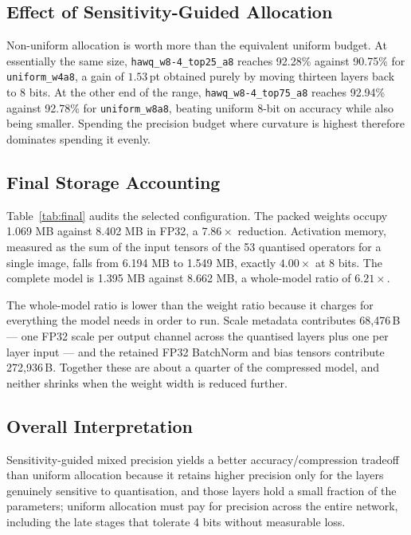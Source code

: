 \documentclass[10pt,a4paper]{article}
\begin{document}
\subsection{Effect of Sensitivity-Guided Allocation}
Non-uniform allocation is worth more than the equivalent uniform budget. At
essentially the same size, \texttt{hawq\_w8-4\_top25\_a8} reaches 92.28\% against
90.75\% for \texttt{uniform\_w4a8}, a gain of $1.53$\,pt obtained purely by moving
thirteen layers back to 8 bits. At the other end of the range, \texttt{hawq\_w8-4\_top75\_a8} reaches 92.94\% against
92.78\% for \texttt{uniform\_w8a8}, beating uniform 8-bit on accuracy while also
being smaller. Spending the precision budget where curvature is highest therefore
dominates spending it evenly.

\subsection{Final Storage Accounting}
\label{sec:storage}
Table~\ref{tab:final} audits the selected configuration. The packed weights
occupy 1.069 MB against 8.402 MB in FP32, a $7.86\times$ reduction. Activation
memory, measured as the sum of the input tensors of the 53 quantised operators
for a single image, falls from 6.194 MB to 1.549 MB, exactly $4.00\times$ at 8
bits. The complete model is 1.395 MB against 8.662 MB, a whole-model ratio of
$6.21\times$.

The whole-model ratio is lower than the weight ratio because it charges for
everything the model needs in order to run. Scale metadata contributes
68{,}476\,B --- one FP32 scale per output channel across the quantised layers plus
one per layer input --- and the retained FP32 BatchNorm and bias tensors
contribute 272{,}936\,B. Together these are about a quarter of the compressed
model, and neither shrinks when the weight width is reduced further.

\TableFinal

\subsection{Overall Interpretation}
Sensitivity-guided mixed precision yields a better accuracy/compression tradeoff
than uniform allocation because it retains higher precision only for the layers
genuinely sensitive to quantisation, and those layers hold a small fraction of the
parameters; uniform allocation must pay for precision across the entire network,
including the late stages that tolerate 4 bits without measurable loss.
\end{document}
